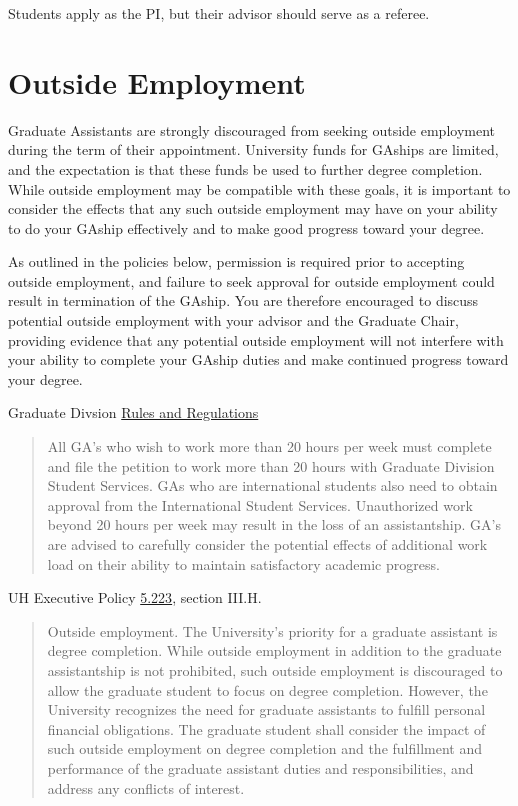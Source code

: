 \documentclass[
]{book}
\begin{document}
Students apply as the PI, but their advisor should serve as a referee.

\section{Outside Employment}\label{outside-employment}

Graduate Assistants are strongly discouraged from seeking outside employment during the term of their appointment. University funds for GAships are limited, and the expectation is that these funds be used to further degree completion. While outside employment may be compatible with these goals, it is important to consider the effects that any such outside employment may have on your ability to do your GAship effectively and to make good progress toward your degree.

As outlined in the policies below, permission is required prior to accepting outside employment, and failure to seek approval for outside employment could result in termination of the GAship. You are therefore encouraged to discuss potential outside employment with your advisor and the Graduate Chair, providing evidence that any potential outside employment will not interfere with your ability to complete your GAship duties and make continued progress toward your degree.

Graduate Divsion \href{https://manoa.hawaii.edu/graduate/rules-regulations/}{Rules and Regulations}

\begin{quote}
All GA's who wish to work more than 20 hours per week must complete and file the petition to work more than 20 hours with Graduate Division Student Services. GAs who are international students also need to obtain approval from the International Student Services. Unauthorized work beyond 20 hours per week may result in the loss of an assistantship. GA's are advised to carefully consider the potential effects of additional work load on their ability to maintain satisfactory academic progress.
\end{quote}

UH Executive Policy \href{https://www.hawaii.edu/policy/?action=viewPolicy&policySection=ep&policyChapter=5&policyNumber=223}{5.223}, section III.H.

\begin{quote}
Outside employment. The University's priority for a graduate assistant is degree completion. While outside employment in addition to the graduate assistantship is not prohibited, such outside employment is discouraged to allow the graduate student to focus on degree completion. However, the University recognizes the need for graduate assistants to fulfill personal financial obligations. The graduate student shall consider the impact of such outside employment on degree completion and the fulfillment and performance of the graduate assistant duties and responsibilities, and address any conflicts of interest.
\end{quote}
\end{document}
